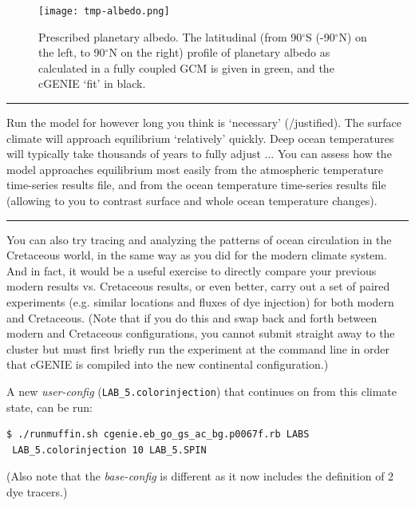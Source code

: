 \documentclass[11pt,fleqn]{book} %
\begin{document}
\begin{figure}
\texttt{[image: tmp-albedo.png]}\centering
\vspace{-6mm}
\caption{Prescribed planetary albedo. 
The latitudinal (from 90$^{\circ}$S (-90$^{\circ}$N) on the left, to 90$^{\circ}$N on the right) profile of planetary albedo as calculated in a fully coupled GCM is given in green, and the cGENIE ‘fit’ in black.}
\label{fig:tmp-albedo}
\end{figure}

\vspace{1mm}
\noindent\rule{4cm}{0.1mm}
\vspace{2mm}

\noindent Run the model for however long you think is ‘necessary’ (/justified). The surface climate will approach equilibrium ‘relatively’ quickly. Deep ocean temperatures will typically take thousands of years to fully adjust ... You can assess how the model approaches equilibrium most easily from the atmospheric temperature time-series results file, and from the ocean temperature time-series results file (allowing to you to contrast surface and whole ocean temperature changes).

\vspace{1mm}
\noindent\rule{4cm}{0.1mm}
\vspace{2mm}

\noindent You can also try tracing and analyzing the patterns of ocean circulation in the Cretaceous world, in the same way as you did for the modern climate system. And in fact, it would be a useful exercise to directly compare your previous modern results vs. Cretaceous results, or even better, carry out a set of paired experiments (e.g. similar locations and fluxes of dye injection) for both modern and Cretaceous. (Note that if you do this and swap back and forth between modern and Cretaceous configurations, you cannot submit straight away to the cluster but must first briefly run the experiment at the command line in order that cGENIE is compiled into the new continental configuration.)

A new \textit{user-config} (\texttt{LAB\_5.colorinjection}) that continues on from this climate state, can be run: 
\begin{verbatim}
$ ./runmuffin.sh cgenie.eb_go_gs_ac_bg.p0067f.rb LABS 
 LAB_5.colorinjection 10 LAB_5.SPIN 
\end{verbatim}
(Also note that the \textit{base-config} is different as it now includes the definition of 2 dye tracers.)
\end{document}
